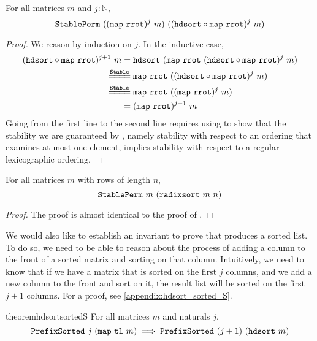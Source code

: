 \documentclass[sigplan,10pt,anonymous,review]{thesis}
\begin{document}
\begin{lemma}
  For all matrices $m$ and $j : \mathbb{N}$,
  \begin{equation*}
    \texttt{\textup{StablePerm}}~((\texttt{\textup{map}}~\texttt{\textup{rrot}})^j~m)~
                     ((\texttt{\textup{hdsort}} \circ \texttt{\textup{map}}~\texttt{\textup{rrot}})^j~m)
  \end{equation*}
\end{lemma}
\begin{proof}
  We reason by induction on $j$. In the inductive case,
  \begin{align*}
    (\var{hdsort} \comp \var{map}~\var{rrot})^{j+1}~m ={}&
    \var{hdsort}~(\var{map}~\var{rrot}~(\var{hdsort} \comp
    \var{map}~\var{rrot})^j~m) \\
    \eqstable{}& \var{map}~\var{rrot}~((\var{hdsort} \comp
    \var{map}~\var{rrot})^j~m) \\
    \eqstable{}& \var{map}~\var{rrot}~((\var{map}~\var{rrot})^j~m) \\
    ={}& (\var{map}~\var{rrot})^{j+1}~m
  \end{align*}
  Going from the first line to the second line requires using
   to show that the stability we are
  guaranteed by , namely stability with respect to an
  ordering that examines at most one element, implies stability with
  respect to a regular lexicographic ordering.
\end{proof}

\begin{theorem}
  For all matrices $m$ with rows of length $n$,
  \begin{equation*}
    \texttt{\textup{StablePerm}}~m~(\texttt{\textup{radixsort}}~m~n)
  \end{equation*}
\end{theorem}
\begin{proof}
  The proof is almost identical to the proof of .
\end{proof}

We would also like to establish an invariant to prove that
 produces a sorted list. To do so, we need to be able
to reason about the process of adding a column to the front of a
sorted matrix and sorting on that column. Intuitively, we need to know
that if we have a matrix that is sorted on the first $j$ columns, and
we add a new column to the front and sort on it, the result list will
be sorted on the first $j+1$ columns. For a proof, see
\cref{appendix:hdsort_sorted_S}.
\begin{restatable*}{theorem}{hdsortsortedS}
  For all matrices $m$ and naturals $j$,
  \begin{equation*}
    \texttt{\textup{PrefixSorted}}~j~(\texttt{\textup{map}}~\texttt{\textup{tl}}~m) \implies
    \texttt{\textup{PrefixSorted}}~(j+1)~(\texttt{\textup{hdsort}}~m)
  \end{equation*}
\end{restatable*}
\end{document}
